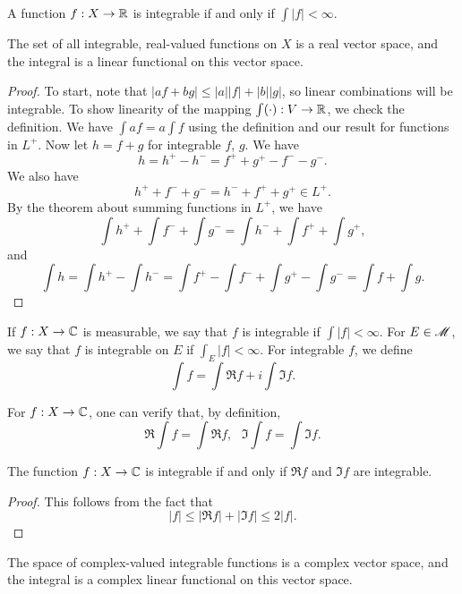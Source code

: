 \documentclass[12pt]{article} %
\begin{document}
\begin{proposition}
    A function $f : X \to \mathbb{R}$ is integrable if and only if $\int |f| < \infty$.
\end{proposition}

\begin{proposition}
    The set of all integrable, real-valued functions on $X$ is a real vector space, and the integral is a linear functional on this vector space.
\end{proposition}

\begin{proof}
    To start, note that $|af + bg| \leq |a||f| + |b||g|$, so linear combinations will be integrable. To show linearity of the mapping $\int (\cdot) : V \to \mathbb{R}$, we check the definition. We have $\int a f = a \int f$ using the definition and our result for functions in $L^+$. Now let $h = f + g$ for integrable $f$, $g$. We have \[h = h^+ - h^- = f^+ + g^+ - f^- - g^-.\] We also have \[h^+ + f^- + g^- = h^- + f^+ + g^+ \in L^+.\] By the theorem about summing functions in $L^+$, we have \[\int h^+ + \int f^- + \int g^- = \int h^- + \int f^+ + \int g^+,\] and \[\int h = \int h^+ - \int h^- = \int f^+ - \int f^-  +\int g^+ - \int g^- = \int f + \int g.\]
\end{proof}

\begin{definition}
    If $f : X \to \mathbb{C}$ is measurable, we say that $f$ is integrable if $\int |f| < \infty$. For $E \in \mathscr{M}$, we say that $f$ is integrable on $E$ if $\int_E |f| < \infty$. For integrable $f$, we define \[\int f = \int \Re f + i \int \Im f.\]
\end{definition}

\begin{remark}
    For $f : X \to \mathbb{C}$, one can verify that, by definition, \[\Re \int f = \int \Re f, \ \ \ \Im \int f = \int \Im f.\]
\end{remark}

\begin{proposition}
    The function $f: X \to \mathbb{C}$ is integrable if and only if $\Re f$ and $\Im f$ are integrable. 
\end{proposition}

\begin{proof}
    This follows from the fact that \[|f| \leq |\Re f| + |\Im f| \leq 2|f|.\]
\end{proof}

\begin{proposition}
    The space of complex-valued integrable functions is a complex vector space, and the integral is a complex linear functional on this vector space.
\end{proposition}
\end{document}
